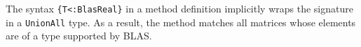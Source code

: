 \documentclass[10pt, preprint]{sigplanconf}
\begin{document}
The syntax \verb|{T<:BlasReal}| in a method definition implicitly wraps the
signature in a \verb|UnionAll| type. As a result, the method matches all
matrices whose elements are of a type supported by BLAS.









\end{document}
